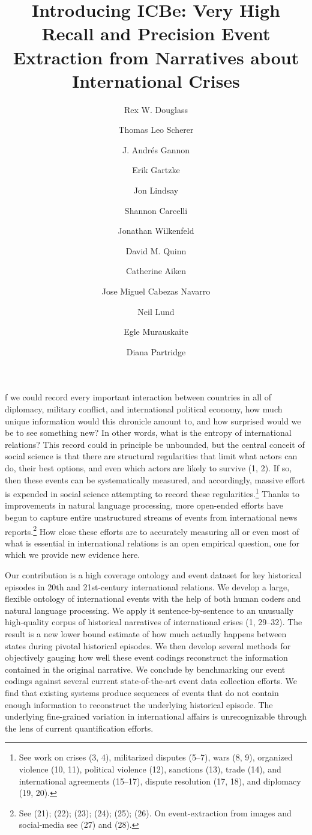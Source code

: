 \documentclass[9pt,twocolumn,twoside,lineno]{pnas-new}
\title{Introducing ICBe: Very High Recall and Precision Event Extraction
from Narratives about International Crises}
\author[a,1]{Rex W. Douglass}
\author[a]{Thomas Leo Scherer}
\author[b]{J. Andrés Gannon}
\author[a]{Erik Gartzke}
\author[c]{Jon Lindsay}
\author[d]{Shannon Carcelli}
\author[d]{Jonathan Wilkenfeld}
\author[d]{David M. Quinn}
\author[e]{Catherine Aiken}
\author[f]{Jose Miguel Cabezas Navarro}
\author[d]{Neil Lund}
\author[d]{Egle Murauskaite}
\author[d]{Diana Partridge}
\affil[a]{University of California, San Diego }
\affil[b]{Vanderbilt University}
\affil[c]{Georgia Institute of Technology}
\affil[d]{University of Maryland}
\affil[e]{Georgetown University}
\affil[f]{Universidad Mayor}
\begin{document}
\maketitle
\thispagestyle{firststyle}


f we could record every important interaction between countries in all
of diplomacy, military conflict, and international political economy,
how much unique information would this chronicle amount to, and how
surprised would we be to see something new? In other words, what is the
entropy of international relations? This record could in principle be
unbounded, but the central conceit of social science is that there are
structural regularities that limit what actors can do, their best
options, and even which actors are likely to survive (1, 2). If so, then
these events can be systematically measured, and accordingly, massive
effort is expended in social science attempting to record these
regularities.\footnote{See work on crises (3, 4), militarized disputes
  (5--7), wars (8, 9), organized violence (10, 11), political violence
  (12), sanctions (13), trade (14), and international agreements
  (15--17), dispute resolution (17, 18), and diplomacy (19, 20).} Thanks
to improvements in natural language processing, more open-ended efforts
have begun to capture entire unstructured streams of events from
international news reports.\footnote{See (21); (22); (23); (24); (25);
  (26). On event-extraction from images and social-media see (27) and
  (28).} How close these efforts are to accurately measuring all or even
most of what is essential in international relations is an open
empirical question, one for which we provide new evidence here.

Our contribution is a high coverage ontology and event dataset for key
historical episodes in 20th and 21st-century international relations. We
develop a large, flexible ontology of international events with the help
of both human coders and natural language processing. We apply it
sentence-by-sentence to an unusually high-quality corpus of historical
narratives of international crises (1, 29--32). The result is a new
lower bound estimate of how much actually happens between states during
pivotal historical episodes. We then develop several methods for
objectively gauging how well these event codings reconstruct the
information contained in the original narrative. We conclude by
benchmarking our event codings against several current state-of-the-art
event data collection efforts. We find that existing systems produce
sequences of events that do not contain enough information to
reconstruct the underlying historical episode. The underlying
fine-grained variation in international affairs is unrecognizable
through the lens of current quantification efforts.
\end{document}
